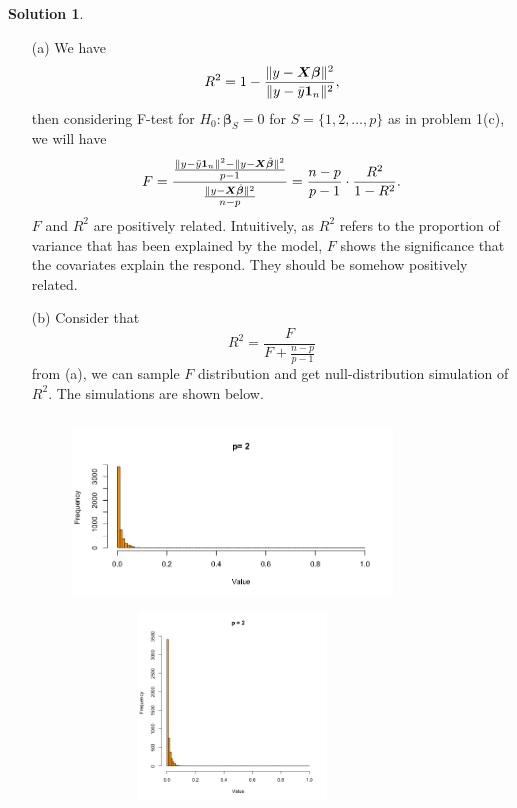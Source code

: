 \documentclass[11pt,letterpaper,english,oneside]{article} %
\theoremstyle{definition} %
\newtheorem{solution}{Solution}
\newenvironment{sol}{\begin{solution}\hspace{0pt}}{\end{solution}}
\begin{document}
    \begin{sol}
    \begin{itemize}
        \item[(a)]
        We have 
        $$
R^2 = 1 - \frac{\|y - \bm X \bm \beta\|^2}{\|y - \Bar{y}\textbf{1}_n\|^2},
        $$
        then considering F-test for $H_0: \bm \beta_S = 0$ for $S = \{1,2,\ldots,p\}$ as in problem 1(c), we will have
        $$
            F = \frac{\frac{\|y - \Bar{y}\textbf{1}_n\|^2 - \|y - \bm X \hat{\bm \beta}\|^2}{p-1}}{\frac{\|y - \bm X \hat{\bm \beta}\|^2}{n-p}} = \frac{n-p}{p-1} \cdot \frac{R^2}{1 - R^2}.
        $$
        $F$ and $R^2$ are positively related. Intuitively, as $R^2$ refers to the proportion of variance that has been explained by the model, $F$ shows the significance that the covariates explain the respond. They should be somehow positively related.

        \item[(b)] Consider that $$
            R^2 = \frac{F}{F + \frac{n-p}{p-1}}
        $$
        from (a), we can sample $F$ distribution and get null-distribution simulation of $R^2$. The simulations are shown below.
        \begin{figure}
\begin{minipage}[ht]{0.5\linewidth}
\centering
    \includegraphics[height = 5cm, width =8.5cm]{figures-and-tables/2-2-1.png}
    \end{minipage}
\begin{minipage}[ht]{0.5\linewidth}
   \centering
    \includegraphics[height = 5cm, width =8.5cm]{figures-and-tables/2-2-2.png}
    \end{minipage}
\end{figure}


\end{itemize}
\end{sol}
\end{document}
